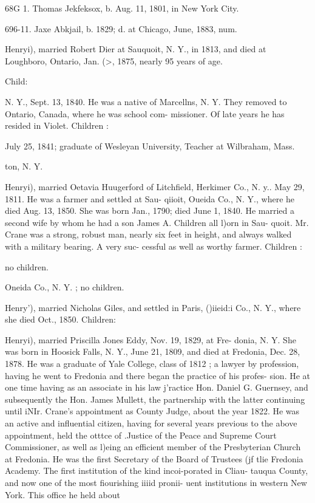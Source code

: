 \documentclass[oneside]{book}
\begin{document}
68G 1. Thomas Jekfeksox, b. Aug. 11, 1801, in New York City. 










696-11. Jaxe Abkjail, b. 1829; d. at Chicago, June, 1883, num. 



Henryi), married Robert Dier at Sauquoit, N. Y., in 1813, and 
died at Loughboro, Ontario, Jan. (>, 1875, nearly 95 years of age. 

Child: 


N. Y., Sept. 13, 1840. He was a native of Marcellns, N. Y. 
They removed to Ontario, Canada, where he was school com- 
missioner. Of late years he has resided in Violet. Children : 


July 25, 1841; graduate of Wesleyan University, 
Teacher at Wilbraham, Mass. 


ton, N. Y. 









Henryi), married Oetavia Huugerford of Litchfield, Herkimer 
Co., N. y.. May 29, 1811. He was a farmer and settled at Sau- 
qiioit, Oueida Co., N. Y., where he died Aug. 13, 1850. She 
was born Jan., 1790; died June 1, 1840. He married a second 
wife by whom he had a son James A. Children all l)orn in Sau- 
quoit. Mr. Crane was a strong, robust man, nearly six feet in 
height, and always walked with a military bearing. A very suc- 
cessful as well as worthy farmer. Children : 





no children. 

Oneida Co., N. Y. ; no children. 

Henry'), married Nicholas Giles, and settled in Paris, ()iieid:i 
Co., N. Y., where she died Oct., 1850. Children: 





Henryi), married Priscilla Jones Eddy, Nov. 19, 1829, at Fre- 
donia, N. Y. She was born in Hoosick Falls, N. Y., June 21, 
1809, and died at Fredonia, Dec. 28, 1878. He was a graduate 
of Yale College, class of 1812 ; a lawyer by profession, having 
he went to Fredonia and there began the practice of his profes- 
sion. He at one time having as an associate in his law j'ractice 
Hon. Daniel G. Guernsey, and subsequently the Hon. James 
Mullett, the partnership with the latter continuing until iNIr. 
Crane's appointment as County Judge, about the year 1822. He 
was an active and influential citizen, having for several years 
previous to the above appointment, held the otttce of .Justice of 
the Peace and Supreme Court Commissioner, as well as l)eing an 
efficient member of the Presbyterian Church at Fredonia. He 
was the first Secretary of the Board of Trustees (jf tlie Fredonia 
Academy. The first institution of the kind incoi-porated in Cliau- 
tauqua County, and now one of the most fiourishing iiiid pronii- 
uent institutions in western New York. This office he held about 
\end{document}
